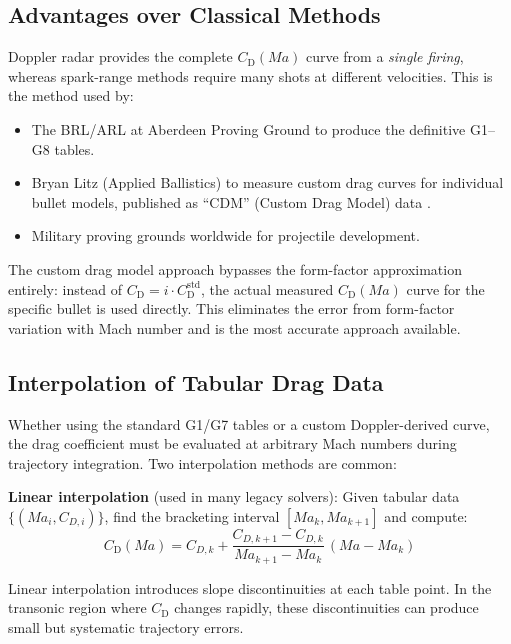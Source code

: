 \documentclass[11pt,twoside,openright]{report}
\newcommand{\Cd}{C_{\mathrm{D}}}
\newcommand{\Mach}{\mathit{Ma}}
\begin{document}
\subsection{Advantages over Classical Methods}

Doppler radar provides the complete $\Cd(\Mach)$ curve from a \emph{single firing}, whereas spark-range methods require many shots at different velocities. This is the method used by:

\begin{itemize}[nosep]
  \item The BRL/ARL at Aberdeen Proving Ground to produce the definitive G1--G8 tables.
  \item Bryan Litz (Applied Ballistics) to measure custom drag curves for individual bullet models, published as ``CDM'' (Custom Drag Model) data \citep{litz2015ballistic}.
  \item Military proving grounds worldwide for projectile development.
\end{itemize}

The custom drag model approach bypasses the form-factor approximation entirely: instead of $\Cd = i \cdot \Cd^{\mathrm{std}}$, the actual measured $\Cd(\Mach)$ curve for the specific bullet is used directly. This eliminates the error from form-factor variation with Mach number and is the most accurate approach available.

\subsection{Interpolation of Tabular Drag Data}
\label{sec:interpolation}

Whether using the standard G1/G7 tables or a custom Doppler-derived curve, the drag coefficient must be evaluated at arbitrary Mach numbers during trajectory integration. Two interpolation methods are common:

\textbf{Linear interpolation} (used in many legacy solvers): Given tabular data $\{(\Mach_i, C_{D,i})\}$, find the bracketing interval $[\Mach_k, \Mach_{k+1}]$ and compute:
\begin{equation}
  \Cd(\Mach) = C_{D,k} + \frac{C_{D,k+1} - C_{D,k}}{\Mach_{k+1} - \Mach_k}\,(\Mach - \Mach_k)
  \label{eq:linear_interp}
\end{equation}

Linear interpolation introduces slope discontinuities at each table point. In the transonic region where $\Cd$ changes rapidly, these discontinuities can produce small but systematic trajectory errors.
\end{document}
